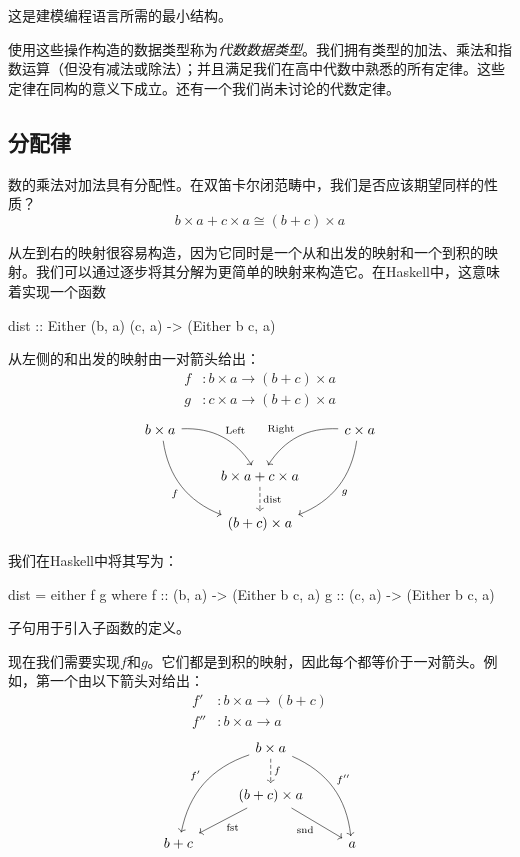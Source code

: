 \documentclass[DaoFP]{subfiles}
\begin{document}
这是建模编程语言所需的最小结构。

使用这些操作构造的数据类型称为\emph{代数数据类型}。我们拥有类型的加法、乘法和指数运算（但没有减法或除法）；并且满足我们在高中代数中熟悉的所有定律。这些定律在同构的意义下成立。还有一个我们尚未讨论的代数定律。

\subsection{分配律}

数的乘法对加法具有分配性。在双笛卡尔闭范畴中，我们是否应该期望同样的性质？
\[b \times a + c \times a \cong (b + c) \times a\]

从左到右的映射很容易构造，因为它同时是一个从和出发的映射和一个到积的映射。我们可以通过逐步将其分解为更简单的映射来构造它。在Haskell中，这意味着实现一个函数
\begin{haskell}
dist :: Either (b, a) (c, a) -> (Either b c, a)
\end{haskell}
从左侧的和出发的映射由一对箭头给出：
\begin{align*}
f &\colon b\times a \to (b + c) \times a \\
g &\colon c\times a \to (b + c) \times a 
\end{align*}
\[
 \begin{tikzcd}
 b \times a
 \arrow[dr,  bend left, "\text{Left}"]
 \arrow[ddr, bend right, "f"']
 && c \times a
 \arrow[dl, bend right, "\text{Right}"']
 \arrow[ddl, bend left, "g"]
 \\
& b \times a + c \times a
\arrow[d, dashed, "\text{dist}"]
\\
& (b + c) \times a
 \end{tikzcd}
\]

我们在Haskell中将其写为：
\begin{haskell}
dist = either f g
  where
    f   :: (b, a) -> (Either b c, a)
    g   :: (c, a) -> (Either b c, a)
\end{haskell}
子句用于引入子函数的定义。

现在我们需要实现$f$和$g$。它们都是到积的映射，因此每个都等价于一对箭头。例如，第一个由以下箭头对给出：
\begin{align*}
f' &\colon b \times a \to (b + c) \\
f'' &\colon b \times a \to  a
\end{align*}
\[
 \begin{tikzcd}
 & b \times a
\arrow[d, dashed, "f"]
 \arrow[ddl, bend right, "f'"']
 \arrow[ddr, bend left, "f''"]
\\
& (b + c) \times a
 \arrow[dl,  "\text{fst}"]
  \arrow[dr,   "\text{snd}"']
\\
b + c && a
 \end{tikzcd}
\]
\end{document}
